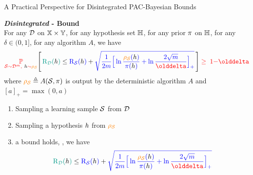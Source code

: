 \documentclass{slides}
\begin{document}
\begin{xframe}{A Practical Perspective for Disintegrated PAC-Bayesian Bounds}

\begin{xblock}{}
\textbf{{\it Disintegrated} - Bound} {\scriptsize\citep[Example based on][]{RivasplataKuzborskijSzepesvariShaweTaylor2020}}\\

{\scriptsize For any $\D$ on $\X\times\Y$, for any hypothesis set $\H$, for any prior $\P$ on $\H$, for any $\delta\in(0, 1]$, for any algorithm $A$, we have}\\[-0.6cm]
\begin{align*}
\red{\PP_{\dS\sim\D^\m,\ \black{\h}\sim\AQ}}\Bigg[\, \green{\Risk_{\D}(\black{h})} \le \blue{\Risk_{\dS}(\black{h})} +  \blue{\sqrt{\frac{1}{2m}\Big[ \ln\frac{\AQ(\black{\h})}{\P(\black{\h})} +\ln\frac{2\sqrt{m}}{\delta}\Big]_{+}}} \,\Bigg]\red{\;\ge\; 1{-}\delta}
\end{align*}
{\small where $\AQ \defeq A(\dS, \P)$ is output by the deterministic algorithm $A$ and $[a]_+ = \max(0,a)$}
\end{xblock}

\vspace{-0.2cm}

\begin{redbox}{}
\vspace{-0.1cm}
\begin{enumerate}
    \item Sampling a learning sample $\dS$ from $\D$
    \item Sampling a hypothesis $\h$ from $\AQ$
    \item {} a bound holds, \eg, we have\\[-0.6cm]
    \begin{align*}
    \green{\Risk_{\D}(\black{h})} \le \blue{\Risk_{\dS}(\black{h})} +  \blue{\sqrt{\frac{1}{2m}\Big[ \ln\frac{\AQ(\black{\h})}{\P(\black{\h})} +\ln\frac{2\sqrt{m}}{\delta}\Big]_{+}}}
    \end{align*}
    \vspace{-0.6cm}
\end{enumerate}
\end{redbox}
\end{xframe}

\end{document}
